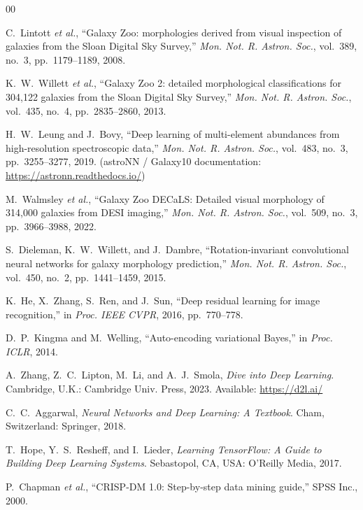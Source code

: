 \documentclass[conference]{IEEEtran}
\begin{document}
\begin{thebibliography}{00}

C.~Lintott \emph{et al.}, ``Galaxy Zoo: morphologies derived from visual inspection of galaxies from the Sloan Digital Sky Survey,'' \emph{Mon. Not. R. Astron. Soc.}, vol.~389, no.~3, pp.~1179--1189, 2008.

K.~W.~Willett \emph{et al.}, ``Galaxy Zoo 2: detailed morphological classifications for 304{,}122 galaxies from the Sloan Digital Sky Survey,'' \emph{Mon. Not. R. Astron. Soc.}, vol.~435, no.~4, pp.~2835--2860, 2013.

H.~W.~Leung and J.~Bovy, ``Deep learning of multi-element abundances from high-resolution spectroscopic data,'' \emph{Mon. Not. R. Astron. Soc.}, vol.~483, no.~3, pp.~3255--3277, 2019. (astroNN / Galaxy10 documentation: \url{https://astronn.readthedocs.io/})

M.~Walmsley \emph{et al.}, ``Galaxy Zoo DECaLS: Detailed visual morphology of 314{,}000 galaxies from DESI imaging,'' \emph{Mon. Not. R. Astron. Soc.}, vol.~509, no.~3, pp.~3966--3988, 2022.

S.~Dieleman, K.~W.~Willett, and J.~Dambre, ``Rotation-invariant convolutional neural networks for galaxy morphology prediction,'' \emph{Mon. Not. R. Astron. Soc.}, vol.~450, no.~2, pp.~1441--1459, 2015.

K.~He, X.~Zhang, S.~Ren, and J.~Sun, ``Deep residual learning for image recognition,'' in \emph{Proc. IEEE CVPR}, 2016, pp.~770--778.

D.~P.~Kingma and M.~Welling, ``Auto-encoding variational Bayes,'' in \emph{Proc. ICLR}, 2014.

A.~Zhang, Z.~C.~Lipton, M.~Li, and A.~J.~Smola, \emph{Dive into Deep Learning}. Cambridge, U.K.: Cambridge Univ. Press, 2023. Available: \url{https://d2l.ai/}

C.~C.~Aggarwal, \emph{Neural Networks and Deep Learning: A Textbook}. Cham, Switzerland: Springer, 2018.

T.~Hope, Y.~S.~Resheff, and I.~Lieder, \emph{Learning TensorFlow: A Guide to Building Deep Learning Systems}. Sebastopol, CA, USA: O'Reilly Media, 2017.

P.~Chapman \emph{et al.}, ``CRISP-DM 1.0: Step-by-step data mining guide,'' SPSS Inc., 2000.



\end{thebibliography}
\end{document}
